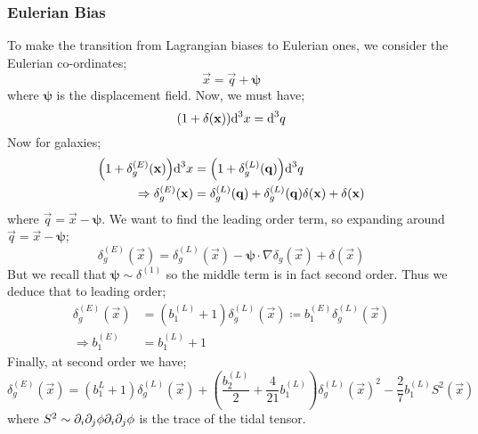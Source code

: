 \subsubsection*{Eulerian Bias}
To make the transition from Lagrangian biases to Eulerian ones, we consider the Eulerian co-ordinates;
\begin{equation*}
\vec{x} = \vec{q} + \bm{\psi}
\end{equation*}
where $\bm{\psi}$ is the displacement field. Now, we must have;
\begin{equation*}
\left(1 + \delta(\vec{x})\right) \ud^3 x = \ud^3 q
\end{equation*}
Now for galaxies;
\begin{align*}
\left(1 + \delta_g^{(E)}(\vec{x})\right) \ud^3 x &= \left(1 + \delta_g^{(L)}(\vec{q})\right)\ud^3 q \\
\Rightarrow \delta_g^{(E)}(\vec{x}) &= \delta_g^{(L)}(\vec{q}) + \delta_g^{(L)}(\vec{q})\delta(\vec{x}) + \delta(\vec{x})
\end{align*}
where $\vec{q} = \vec{x} - \bm{\psi}$. We want to find the leading order term, so expanding around $\vec{q} = \vec{x} - \bm{\psi}$;
\begin{equation*}
\delta_g^{(E)}(\vec{x}) = \delta_g^{(L)}(\vec{x}) - \bm{\psi}\cdot\nabla \delta_g(\vec{x}) + \delta(\vec{x})
\end{equation*}
But we recall that $\bm{\psi} \sim \delta^{(1)}$ so the middle term is in fact second order. Thus we deduce that to leading order;
\begin{align*}
\delta_g^{(E)}(\vec{x}) &= (b_1^{(L)} + 1)\delta_g^{(L)}(\vec{x}) \coloneqq b_1^{(E)}\delta^{(L)}_g(\vec{x}) \\
\Rightarrow b_1^{(E)} &= b_1^{(L)} + 1
\end{align*}
Finally, at second order we have;
\begin{equation*}
\delta_g^{(E)}(\vec{x}) = (b_1^{L} + 1)\delta^{(L)}_g(\vec{x}) + \left(\frac{b_2^{(L)}}{2} + \frac{4}{21}b_1^{(L)}\right) \delta^{(L)}_g(\vec{x})^2 - \frac{2}{7}b_1^{(L)}S^2(\vec{x})
\end{equation*}
where $S^2 \sim \partial_i \partial_j \phi \partial_i \partial_j \phi$ is the trace of the tidal tensor.







